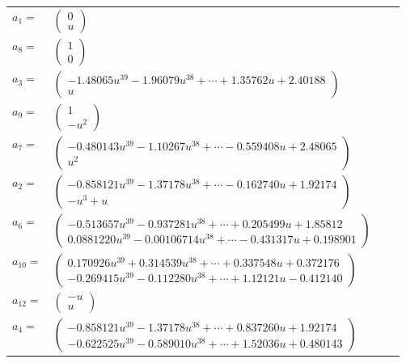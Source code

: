 \documentclass[1p]{elsarticle_modified}
\theoremstyle{definition}
\begin{document}
\begin{tabular}{m{7pt} m{180pt} m{7pt} m{180pt} }
\flushright $a_{1}=$&$\begin{pmatrix}0\\u\end{pmatrix}$ \\
\flushright $a_{8}=$&$\begin{pmatrix}1\\0\end{pmatrix}$ \\
\flushright $a_{3}=$&$\begin{pmatrix}-1.48065 u^{39}-1.96079 u^{38}+\cdots+1.35762 u+2.40188\\u\end{pmatrix}$ \\
\flushright $a_{9}=$&$\begin{pmatrix}1\\- u^2\end{pmatrix}$ \\
\flushright $a_{7}=$&$\begin{pmatrix}-0.480143 u^{39}-1.10267 u^{38}+\cdots-0.559408 u+2.48065\\u^2\end{pmatrix}$ \\
\flushright $a_{2}=$&$\begin{pmatrix}-0.858121 u^{39}-1.37178 u^{38}+\cdots-0.162740 u+1.92174\\- u^3+u\end{pmatrix}$ \\
\flushright $a_{6}=$&$\begin{pmatrix}-0.513657 u^{39}-0.937281 u^{38}+\cdots+0.205499 u+1.85812\\0.0881220 u^{39}-0.00106714 u^{38}+\cdots-0.431317 u+0.198901\end{pmatrix}$ \\
\flushright $a_{10}=$&$\begin{pmatrix}0.170926 u^{39}+0.314539 u^{38}+\cdots+0.337548 u+0.372176\\-0.269415 u^{39}-0.112280 u^{38}+\cdots+1.12121 u-0.412140\end{pmatrix}$ \\
\flushright $a_{12}=$&$\begin{pmatrix}- u\\u\end{pmatrix}$ \\
\flushright $a_{4}=$&$\begin{pmatrix}-0.858121 u^{39}-1.37178 u^{38}+\cdots+0.837260 u+1.92174\\-0.622525 u^{39}-0.589010 u^{38}+\cdots+1.52036 u+0.480143\end{pmatrix}$ \\

\end{tabular}
\end{document}
